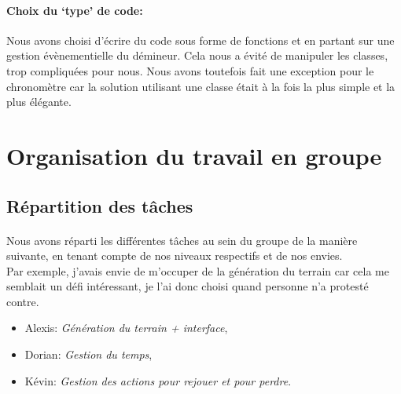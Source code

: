 \documentclass[12pt, a4paper]{article}
\begin{document}
\paragraph{Choix du `type' de code:}
Nous avons choisi d'écrire du code sous forme de fonctions et en partant sur
une gestion évènementielle du démineur. Cela nous a évité de manipuler les
classes, trop compliquées pour nous. Nous avons toutefois fait une exception
pour le chronomètre car la solution utilisant une classe était à la fois la
plus simple et la plus élégante.


\newpage

\section{Organisation du travail en groupe}

\subsection{Répartition des tâches}

\paragraph{}
Nous avons réparti les différentes tâches au sein du groupe de la manière
suivante, en tenant compte de nos niveaux respectifs et de nos envies. \\
Par exemple, j'avais envie de m'occuper de la génération du terrain car cela
me semblait un défi intéressant, je l'ai donc choisi quand personne n'a
protesté contre.

\begin{itemize}
\item Alexis: \emph{Génération du terrain + interface},
\item Dorian: \emph{Gestion du temps},
\item Kévin: \emph{Gestion des actions pour rejouer et pour perdre}.
\end{itemize}


\end{document}
